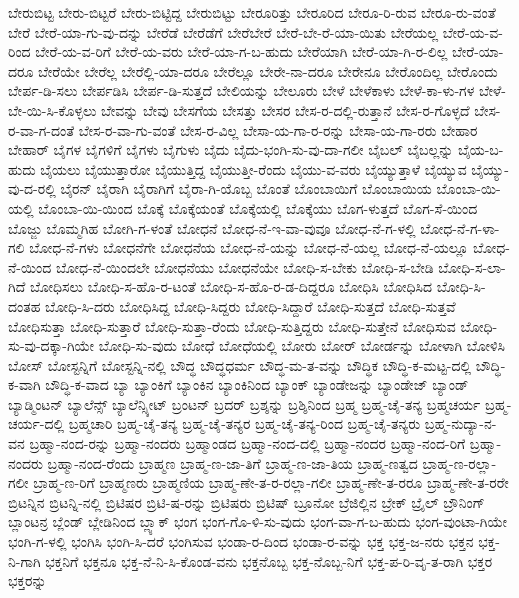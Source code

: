 {ಬೇರುಬಿಟ್ಟ
ಬೇರು-ಬಿಟ್ಟರೆ
ಬೇರು-ಬಿಟ್ಟಿದ್ದ
ಬೇರುಬಿಟ್ಟು
ಬೇರೂರಿತ್ತು
ಬೇರೂರಿದ
ಬೇರೂ-ರಿ-ರುವ
ಬೇರೂ-ರು-ವಂತೆ
ಬೇರೆ
ಬೇರೆ-ಯಾ-ಗು-ವು-ದನ್ನು
ಬೇರೆಡೆ
ಬೇರೆಡೆಗೆ
ಬೇರೆಬೇರೆ
ಬೇರೆ-ಬೇ-ರೆ-ಯಾ-ಯಿತು
ಬೇರೆಯಲ್ಲ
ಬೇರೆ-ಯ-ವ-ರಿಂದ
ಬೇರೆ-ಯ-ವ-ರಿಗೆ
ಬೇರೆ-ಯ-ವರು
ಬೇರೆ-ಯಾ-ಗ-ಬ-ಹುದು
ಬೇರೆಯಾಗಿ
ಬೇರೆ-ಯಾ-ಗಿ-ರ-ಲಿಲ್ಲ
ಬೇರೆ-ಯಾ-ದರೂ
ಬೇರೆಯೇ
ಬೇರೆಲ್ಲ
ಬೇರೆಲ್ಲಿ-ಯಾ-ದರೂ
ಬೇರೆಲ್ಲೂ
ಬೇರೇ-ನಾ-ದರೂ
ಬೇರೇನೂ
ಬೇರೊಂದಿಲ್ಲ
ಬೇರೊಂದು
ಬೇರ್ಪ-ಡಿ-ಸಲು
ಬೇರ್ಪಡಿಸಿ
ಬೇರ್ಪ-ಡಿ-ಸುತ್ತದೆ
ಬೇಲಿಯನ್ನು
ಬೇಲೂರು
ಬೇಳೆ
ಬೇಳೆಕಾಳು
ಬೇಳೆ-ಕಾ-ಳು-ಗಳ
ಬೇಳೆ-ಬೇ-ಯಿ-ಸಿ-ಕೊಳ್ಳಲು
ಬೇವನ್ನು
ಬೇವು
ಬೇಸಗೆಯ
ಬೇಸತ್ತು
ಬೇಸರ
ಬೇಸ-ರ-ದಲ್ಲಿ-ರುತ್ತಾನೆ
ಬೇಸ-ರ-ಗೊಳ್ಳದೆ
ಬೇಸ-ರ-ವಾ-ಗ-ದಂತೆ
ಬೇಸ-ರ-ವಾ-ಗು-ವಂತೆ
ಬೇಸ-ರ-ವಿಲ್ಲ
ಬೇಸಾ-ಯ-ಗಾ-ರ-ರನ್ನು
ಬೇಸಾ-ಯ-ಗಾ-ರರು
ಬೇಹಾರ
ಬೇಹಾರ್
ಬೈಗಳ
ಬೈಗಳಿಗೆ
ಬೈಗಳು
ಬೈಗುಳು
ಬೈದು
ಬೈದು-ಭಂಗಿ-ಸು-ವು-ದಾ-ಗಲೀ
ಬೈಬಲ್
ಬೈಬಲ್ಲನ್ನು
ಬೈಯ-ಬ-ಹುದು
ಬೈಯಲು
ಬೈಯುತ್ತಾರೋ
ಬೈಯುತ್ತಿದ್ದ
ಬೈಯುತ್ತೀ-ರೆಂದು
ಬೈಯು-ವ-ವರು
ಬೈಯ್ಯುತ್ತಾಳೆ
ಬೈಯ್ಯುವ
ಬೈಯ್ಯು-ವು-ದ-ರಲ್ಲಿ
ಬೈರನ್
ಬೈರಾಗಿ
ಬೈರಾಗಿಗೆ
ಬೈರಾ-ಗಿ-ಯೊಬ್ಬ
ಬೊಂತೆ
ಬೊಂಬಾಯಿಗೆ
ಬೊಂಬಾಯಿಯ
ಬೊಂಬಾ-ಯಿ-ಯಲ್ಲಿ
ಬೊಂಬಾ-ಯಿ-ಯಿಂದ
ಬೊಕ್ಕೆ
ಬೊಕ್ಕೆಯಂತೆ
ಬೊಕ್ಕೆಯಲ್ಲಿ
ಬೊಕ್ಕೆಯು
ಬೊಗ-ಳುತ್ತದೆ
ಬೊಗ-ಸೆ-ಯಿಂದ
ಬೊಜ್ಜು
ಬೊಮ್ಮಗಿಹ
ಬೋಗಿ-ಗ-ಳಂತೆ
ಬೋಧನೆ
ಬೋಧ-ನೆ-ಇ-ವಾ-ವುವೂ
ಬೋಧ-ನೆ-ಗ-ಳಲ್ಲಿ
ಬೋಧ-ನೆ-ಗ-ಳಾ-ಗಲಿ
ಬೋಧ-ನೆ-ಗಳು
ಬೋಧನೆಗೇ
ಬೋಧನೆಯ
ಬೋಧ-ನೆ-ಯನ್ನು
ಬೋಧ-ನೆ-ಯಲ್ಲ
ಬೋಧ-ನೆ-ಯಲ್ಲೂ
ಬೋಧ-ನೆ-ಯಿಂದ
ಬೋಧ-ನೆ-ಯಿಂದಲೇ
ಬೋಧನೆಯು
ಬೋಧನೆಯೇ
ಬೋಧಿ-ಸ-ಬೇಕು
ಬೋಧಿ-ಸ-ಬೇಡಿ
ಬೋಧಿ-ಸ-ಲಾ-ಗಿದೆ
ಬೋಧಿಸಲು
ಬೋಧಿ-ಸ-ಹೊ-ರ-ಟಂತೆ
ಬೋಧಿ-ಸ-ಹೊ-ರ-ಡ-ದಿದ್ದರೂ
ಬೋಧಿಸಿ
ಬೋಧಿಸಿದ
ಬೋಧಿ-ಸಿ-ದಂತಹ
ಬೋಧಿ-ಸಿ-ದರು
ಬೋಧಿಸಿದ್ದ
ಬೋಧಿ-ಸಿದ್ದರು
ಬೋಧಿ-ಸಿದ್ದಾರೆ
ಬೋಧಿ-ಸುತ್ತದೆ
ಬೋಧಿ-ಸುತ್ತವೆ
ಬೋಧಿಸುತ್ತಾ
ಬೋಧಿ-ಸುತ್ತಾರೆ
ಬೋಧಿ-ಸುತ್ತಾ-ರೆಂದು
ಬೋಧಿ-ಸುತ್ತಿದ್ದರು
ಬೋಧಿ-ಸುತ್ತೇನೆ
ಬೋಧಿಸುವ
ಬೋಧಿ-ಸು-ವು-ದಕ್ಕಾ-ಗಿಯೇ
ಬೋಧಿ-ಸು-ವುದು
ಬೋಧೆ
ಬೋಧೆಯಲ್ಲಿ
ಬೋರು
ಬೋರ್
ಬೋರ್ಡನ್ನು
ಬೋಳಾಗಿ
ಬೋಳಿಸಿ
ಬೋಸ್
ಬೋಸ್ಟನ್ನಿಗೆ
ಬೋಸ್ಟನ್ನಿ-ನಲ್ಲಿ
ಬೌದ್ಧ
ಬೌದ್ಧಧರ್ಮ
ಬೌದ್ಧ-ಮ-ತ-ವನ್ನು
ಬೌದ್ಧಿಕ
ಬೌದ್ಧಿ-ಕ-ಮಟ್ಟ-ದಲ್ಲಿ
ಬೌದ್ಧಿ-ಕ-ವಾಗಿ
ಬೌದ್ಧಿ-ಕ-ವಾದ
ಬ್ಯಾ
ಬ್ಯಾಂಕಿಗೆ
ಬ್ಯಾಂಕಿನ
ಬ್ಯಾಂಕಿನಿಂದ
ಬ್ಯಾಂಕ್
ಬ್ಯಾಂಡೇಜನ್ನು
ಬ್ಯಾಂಡೇಜ್
ಬ್ಯಾಂಡ್
ಬ್ಯಾಡ್ಮಿಂಟನ್
ಬ್ಯಾಲೆನ್ಸ್
ಬ್ಯಾಲೆನ್ಸ್ಶೀಟ್
ಬ್ರಂಟನ್
ಬ್ರದರ್
ಬ್ರಶ್ಶನ್ನು
ಬ್ರಶ್ಶಿನಿಂದ
ಬ್ರಹ್ಮ
ಬ್ರಹ್ಮ-ಚೈ-ತನ್ಯ
ಬ್ರಹ್ಮಚರ್ಯ
ಬ್ರಹ್ಮ-ಚರ್ಯ-ದಲ್ಲಿ
ಬ್ರಹ್ಮಚಾರಿ
ಬ್ರಹ್ಮ-ಚೈ-ತನ್ಯ
ಬ್ರಹ್ಮ-ಚೈ-ತನ್ಯರ
ಬ್ರಹ್ಮ-ಚೈ-ತನ್ಯ-ರಿಂದ
ಬ್ರಹ್ಮ-ಚೈ-ತನ್ಯರು
ಬ್ರಹ್ಮ-ನುದ್ಯಾ-ನ-ವನ
ಬ್ರಹ್ಮಾ-ನಂದ-ರನ್ನು
ಬ್ರಹ್ಮಾ-ನಂದರು
ಬ್ರಹ್ಮಾಂಡದ
ಬ್ರಹ್ಮಾ-ನಂದ-ದಲ್ಲಿ
ಬ್ರಹ್ಮಾ-ನಂದರ
ಬ್ರಹ್ಮಾ-ನಂದ-ರಿಗೆ
ಬ್ರಹ್ಮಾ-ನಂದರು
ಬ್ರಹ್ಮಾ-ನಂದ-ರೆಂದು
ಬ್ರಾಹ್ಮಣ
ಬ್ರಾಹ್ಮ-ಣ-ಜಾ-ತಿಗೆ
ಬ್ರಾಹ್ಮ-ಣ-ಜಾ-ತಿಯ
ಬ್ರಾಹ್ಮ-ಣತ್ವದ
ಬ್ರಾಹ್ಮ-ಣ-ರಲ್ಲಾ-ಗಲೀ
ಬ್ರಾಹ್ಮ-ಣ-ರಿಗೆ
ಬ್ರಾಹ್ಮಣರು
ಬ್ರಾಹ್ಮಣಿಯ
ಬ್ರಾಹ್ಮ-ಣೇ-ತ-ರ-ರಲ್ಲಾ-ಗಲೀ
ಬ್ರಾಹ್ಮ-ಣೇ-ತ-ರರೂ
ಬ್ರಾಹ್ಮ-ಣೇ-ತ-ರರೇ
ಬ್ರಿಟನ್ನಿನ
ಬ್ರಿಟನ್ನಿ-ನಲ್ಲಿ
ಬ್ರಿಟಿಷರ
ಬ್ರಿಟಿ-ಷ-ರನ್ನು
ಬ್ರಿಟಿಷರು
ಬ್ರಿಟಿಷ್
ಬ್ರೂನೋ
ಬ್ರೆಜಿಲ್ಲಿನ
ಬ್ರೇಕ್
ಬ್ರೈಲ್
ಬ್ರೌನಿಂಗ್
ಬ್ಲಾಂಟನ್ರ
ಬ್ಲೆಂಡ್
ಬ್ಲೇಡಿನಿಂದ
ಬ್ಲ್ಯಾಕ್
ಭಂಗ
ಭಂಗ-ಗೊ-ಳಿ-ಸು-ವುದು
ಭಂಗ-ವಾ-ಗ-ಬ-ಹುದು
ಭಂಗ-ವುಂಟಾ-ಗಿಯೇ
ಭಂಗಿ-ಗ-ಳಲ್ಲಿ
ಭಂಗಿಸಿ
ಭಂಗಿ-ಸಿ-ದರೆ
ಭಂಗಿಸುವ
ಭಂಡಾ-ರ-ದಿಂದ
ಭಂಡಾ-ರ-ವನ್ನು
ಭಕ್ತ
ಭಕ್ತ-ಜ-ನರು
ಭಕ್ತನ
ಭಕ್ತ-ನಿ-ಗಾಗಿ
ಭಕ್ತನಿಗೆ
ಭಕ್ತನೂ
ಭಕ್ತ-ನೆ-ನಿ-ಸಿ-ಕೊಂಡ-ವನು
ಭಕ್ತನೊಬ್ಬ
ಭಕ್ತ-ನೊಬ್ಬ-ನಿಗೆ
ಭಕ್ತ-ಪ-ರಿ-ವೃ-ತ-ರಾಗಿ
ಭಕ್ತರ
ಭಕ್ತರನ್ನು
}
